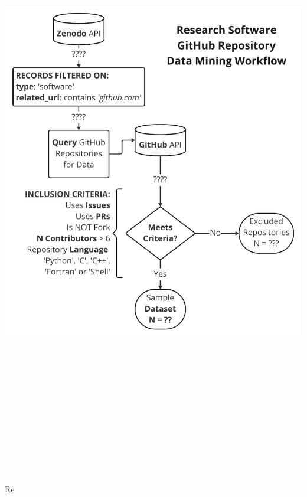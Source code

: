 \documentclass[25pt, a0paper, landscape, margin=10mm, innermargin=15mm, blockverticalspace=10mm, subcolspace=7mm, dvipsnames]{tikzposter} %
\begin{document}
\begin{columns}
{\begin{multicols}{2}
{        %





        
        \begin{tikzfigure}
            \includegraphics[height=270mm]{Figures/epccposter - DataMiningWorkflow.pdf}
        \end{tikzfigure}

        Re}
\end{multicols}}
\end{columns}
\end{document}

